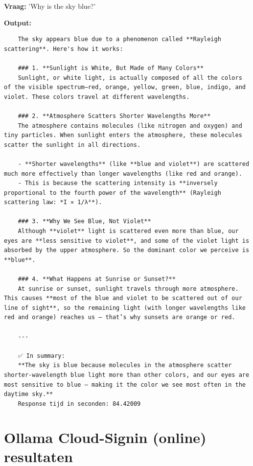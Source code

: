 \textbf{Vraag:} 'Why is the sky blue?'

\textbf{Output:} 

\begin{verbatim}
    The sky appears blue due to a phenomenon called **Rayleigh scattering**. Here's how it works:
    
    ### 1. **Sunlight is White, But Made of Many Colors**
    Sunlight, or white light, is actually composed of all the colors of the visible spectrum—red, orange, yellow, green, blue, indigo, and violet. These colors travel at different wavelengths.
    
    ### 2. **Atmosphere Scatters Shorter Wavelengths More**
    The atmosphere contains molecules (like nitrogen and oxygen) and tiny particles. When sunlight enters the atmosphere, these molecules scatter the sunlight in all directions.
    
    - **Shorter wavelengths** (like **blue and violet**) are scattered much more effectively than longer wavelengths (like red and orange).
    - This is because the scattering intensity is **inversely proportional to the fourth power of the wavelength** (Rayleigh scattering law: *I ∝ 1/λ⁴*).
    
    ### 3. **Why We See Blue, Not Violet**
    Although **violet** light is scattered even more than blue, our eyes are **less sensitive to violet**, and some of the violet light is absorbed by the upper atmosphere. So the dominant color we perceive is **blue**.
    
    ### 4. **What Happens at Sunrise or Sunset?**
    At sunrise or sunset, sunlight travels through more atmosphere. This causes **most of the blue and violet to be scattered out of our line of sight**, so the remaining light (with longer wavelengths like red and orange) reaches us — that’s why sunsets are orange or red.
    
    ---
    
    ✅ In summary:
    **The sky is blue because molecules in the atmosphere scatter shorter-wavelength blue light more than other colors, and our eyes are most sensitive to blue — making it the color we see most often in the daytime sky.**
    Response tijd in seconden: 84.42009
\end{verbatim}

\section{Ollama Cloud-Signin (online) resultaten}
\label{sec:ollamacloudsigninonlineresultaten}

